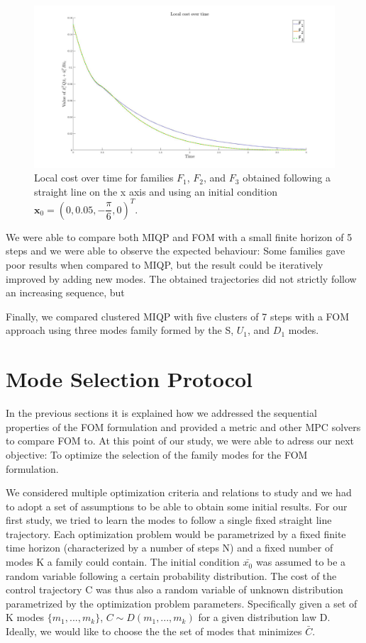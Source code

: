 \documentclass[12,twoside]{TFG-GM}
\theoremstyle{definition}
\theoremstyle{remark}
\newcommand*\mean[1]{\bar{#1}}
\newcommand*\diff[1]{\bar{#1}}
\begin{document}
\begin{figure}[htb!]
\begin{center}
\includegraphics[width=16cm]{chameleon.jpg}
\end{center}
\caption{\label{fig:chameleon} \small Local cost over time for families $F_1$, $F_2$, and $F_3$ obtained following a straight line on the x axis and using an initial condition $\textbf{x}_0 = (0, 0.05, - \dfrac{\pi}{6}, 0)^T$.}
\end{figure}

We were able to compare both MIQP and FOM with a small finite horizon of 5 steps and we were able to observe the expected behaviour: Some families gave poor results when compared to MIQP, but the result could be iteratively improved by adding new modes. The obtained trajectories did not strictly follow an increasing sequence, but 

Finally, we compared clustered MIQP with five clusters of 7 steps with a FOM approach using three modes family formed by the S, $U_1$, and $D_1$ modes. 

\section{Mode Selection Protocol}
\label{sec:modeselection}
In the previous sections it is explained how we addressed the sequential properties of the FOM formulation and provided a metric and other MPC solvers to compare FOM to. At this point of our study, we were able to adress our next objective: To optimize the selection of the family modes for the FOM formulation.

We considered multiple optimization criteria and relations to study and we had to adopt a set of assumptions to be able to obtain some initial results. For our first study, we tried to learn the modes to follow a single fixed straight line trajectory. Each optimization problem would be parametrized by a fixed finite time horizon (characterized by a number of steps N) and a fixed number of modes K a family could contain. The initial condition $\diff{x_0}$ was assumed to be a random variable following a certain probability distribution. The cost of the control trajectory C was thus also a random variable of unknown distribution parametrized by the optimization problem parameters. Specifically given a set of K modes $\{m_1, ..., m_k\}$, $C \sim D(m_1, ..., m_k)$ for a given distribution law D. Ideally, we would like to choose the the set of modes that minimizes $\mean{C}$.
\end{document}

